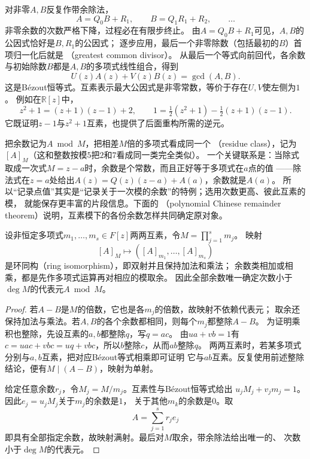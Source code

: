 对非零$A,B$反复作带余除法，
\[
  A=Q_0B+R_1,\qquad B=Q_1R_1+R_2,\qquad\ldots
\]
非零余数的次数严格下降，过程必在有限步终止。
由$A=Q_0B+R_1$可见，$A,B$的公因式恰好是$B,R_1$的公因式；
逐步应用，最后一个非零除数（包括最初的$B$）首项归一化后就是
（greatest common divisor）。
从最后一个等式向前回代，各余数与初始除数$B$都是$A,B$的多项式线性组合，得到
\begin{equation}
  U(z)A(z)+V(z)B(z)=\gcd(A,B).
  \label{eq:signal-analysis-polynomial-bezout}
\end{equation}
这是Bézout恒等式。互素表示最大公因式是非零常数，等价于存在$U,V$使左侧为$1$。
例如在$\mathbb R[z]$中，
\[
  z^2+1=(z+1)(z-1)+2,\qquad
  1=\tfrac12(z^2+1)-\tfrac12(z+1)(z-1).
\]
它既证明$z-1$与$z^2+1$互素，也提供了后面重构所需的逆元。

把余数记为$A\bmod M$，把相差$M$倍的多项式看成同一个
（residue class），记为$[A]_M$（这和整数按模$5$把$2$和$7$看成同一类完全类似）。
一个关键联系是：当除式取成一次式$M=z-a$时，余数是个常数，而且正好等于多项式在$a$点的值
——除法式在$z=a$处给出$A(z)=Q(z)(z-a)+A(a)$，余数就是$A(a)$。
所以“记录点值”其实是“记录关于一次模的余数”的特例；选用次数更高、彼此互素的模，
就能保存更丰富的片段信息。下面的
（polynomial Chinese remainder theorem）说明，互素模下的各份余数怎样共同确定原对象。
\begin{theorem}[多项式中国剩余定理]
  \label{thm:signal-analysis-polynomial-crt}
  设非恒定多项式$m_1,\ldots,m_s\in F[z]$两两互素，令$M=\prod_{j=1}^s m_j$。
  映射
  \[
    [A]_M\longmapsto([A]_{m_1},\ldots,[A]_{m_s})
  \]
  是环同构（ring isomorphism），即双射并且保持加法和乘法；
  余数类相加或相乘，都是先作多项式运算再对相应的模取余。
  因此全部余数唯一确定次数小于$\deg M$的代表元$A\bmod M$。
\end{theorem}
\begin{proof}
  若$A-B$是$M$的倍数，它也是各$m_j$的倍数，故映射不依赖代表元；
  取余还保持加法与乘法。若$A,B$的各个余数都相同，则每个$m_j$都整除$A-B$。
  为证明乘积也整除，先设互素的$a,b$都整除$q$，写$q=ac$。
  由$ua+vb=1$有$c=uac+vbc=uq+vbc$，所以$b$整除$c$，从而$ab$整除$q$。
  两两互素时，若某多项式分别与$a,b$互素，把对应Bézout等式相乘即可证明
  它与$ab$互素。反复使用前述整除结论，便有$M\mid(A-B)$，映射为单射。

  给定任意余数$r_j$，令$M_j=M/m_j$。互素性与Bézout恒等式给出
  $u_jM_j+v_jm_j=1$。因此$e_j=u_jM_j$关于$m_j$的余数是$1$，
  关于其他$m_k$的余数是$0$。取
  \[
    A=\sum_{j=1}^s r_je_j
  \]
  即具有全部指定余数，故映射满射。最后对$M$取余，带余除法给出唯一的、
  次数小于$\deg M$的代表元。
\end{proof}

